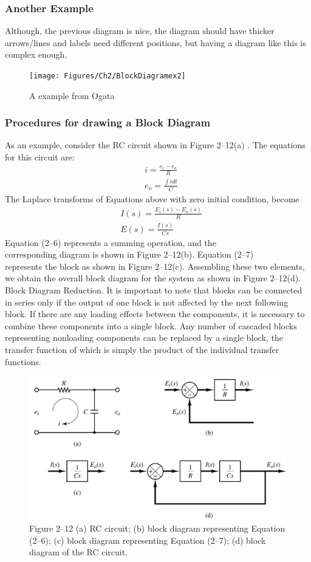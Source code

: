 \documentclass{beamer}
\begin{document}
\begin{frame}
\frametitle{Another Example}
Although, the previous diagram is nice, the diagram should have thicker arrows/lines and labels need different positions, but having a diagram like this is complex enough.
\begin{figure}
	\centering
	\texttt{[image: Figures/Ch2/BlockDiagramex2]}
	\caption{A example from Ogata \cite[p 39, b]{textbook:ogata}}
	\label{fig:blockdiagramex2}
\end{figure}
\end{frame}
\begin{frame}[allowframebreaks]
\frametitle{Procedures for drawing a Block Diagram}
As an example, consider the RC circuit shown in Figure 2–12(a) \cite[p.38]{textbook:ogata}. The equations for
this circuit are:
\begin{align}
& i = \frac{e_i-e_o}{R} \\
& e_o = \frac{\int i dt}{C}
\end{align}
The Laplace transforms of Equations above with zero initial condition, become
\begin{align}
& I(s)=\frac{E_i(s)-E_o(s)}{R} \\
& E(s) = \frac{I(s)}{Cs}
\end{align}
Equation (2–6) represents a summing operation, and the \\
 corresponding diagram is shown in Figure 2–12(b). Equation (2–7) \\ 
 represents the block as shown in Figure 2–12(c). Assembling these two elements, we obtain the overall block diagram for the system as shown in Figure 2–12(d).
\medskip
\noindent
Block Diagram Reduction. It is important to note that blocks can be connected
in series only if the output of one block is not affected by the next following block.
\medskip
\noindent
 If there are any loading effects between the components, it is necessary to combine these
components into a single block.
\medskip
\noindent
Any number of cascaded blocks representing nonloading components can be
replaced by a single block, the transfer function of which is simply the product of the
individual transfer functions.
\medskip
\noindent
\begin{figure}
	\centering
	\includegraphics[width=0.8\linewidth]{Figures/Ch2/ex1}
	\caption{Figure 2–12 (a) RC circuit; (b) block diagram representing Equation (2–6); (c) block diagram representing Equation (2–7); (d) block diagram of the RC circuit.}
	\label{fig:chp2ex1}
\end{figure}

\end{frame}
\end{document}
